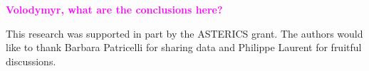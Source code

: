 \documentclass[a0,portrait]{a0poster}
\newcommand{\ECM}[1] {\textbf{\textcolor{magenta}{#1}}}
\begin{document}
\begin{multicols}{2}
\ECM{Volodymyr, what are the conclusions here?}




\vspace{10mm}

{\footnotesize 
  This research was supported in part by the ASTERICS grant. The authors would like to thank Barbara Patricelli for sharing data and Philippe Laurent for fruitful discussions. }




\end{multicols}
\end{document}
